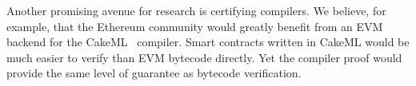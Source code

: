 \documentclass[sigplan,10pt,review]{acmart}\settopmatter{printfolios=true,printccs=false,printacmref=false}
\begin{document}
Another promising avenue for research is certifying compilers.
We believe, for example, that the Ethereum community
would greatly benefit from an EVM backend for the CakeML~\cite{Owens_NKMT_17}
compiler.
Smart contracts written in CakeML would be much easier to verify
than EVM bytecode directly.
Yet the compiler proof would provide the
same level of guarantee as bytecode verification.







\end{document}
